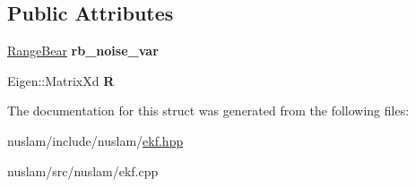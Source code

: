 \subsection*{Public Attributes}
\begin{DoxyCompactItemize}
\item 
\mbox{\label{structnuslam_1_1MeasurementNoise_a628b3f7c9c5a8a9aa53207d156ed7b0a}} 
\hyperlink{structnuslam_1_1RangeBear}{Range\+Bear} {\bfseries rb\+\_\+noise\+\_\+var}
\item 
\mbox{\label{structnuslam_1_1MeasurementNoise_a857eb26ca831b2b4f4fe1d73e007a148}} 
Eigen\+::\+Matrix\+Xd {\bfseries R}
\end{DoxyCompactItemize}


The documentation for this struct was generated from the following files\+:\begin{DoxyCompactItemize}
\item 
nuslam/include/nuslam/\hyperlink{ekf_8hpp}{ekf.\+hpp}\item 
nuslam/src/nuslam/ekf.\+cpp\end{DoxyCompactItemize}
